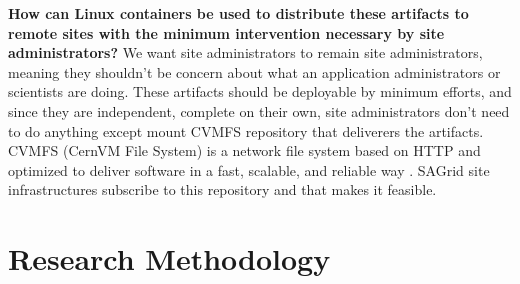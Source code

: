 \documentclass [titlepage,11pt]{article}
\begin{document}
\begin{description}
\item \textbf{How can Linux containers be used to distribute these artifacts to remote sites with the minimum intervention necessary by site administrators?} We want site administrators to remain site administrators, meaning they shouldn't be concern about what an application administrators or scientists are doing. These artifacts should be deployable by minimum efforts, and since they are independent, complete on their own, site administrators don't need to do anything except mount CVMFS repository that deliverers the artifacts. CVMFS (CernVM File System) is a network file system based on HTTP and optimized to deliver software in a fast, scalable, and reliable way \citep{jakob11}. SAGrid site infrastructures subscribe to this repository and that makes it feasible.  \\

\end{description}

\section{Research Methodology}

\end{document}
